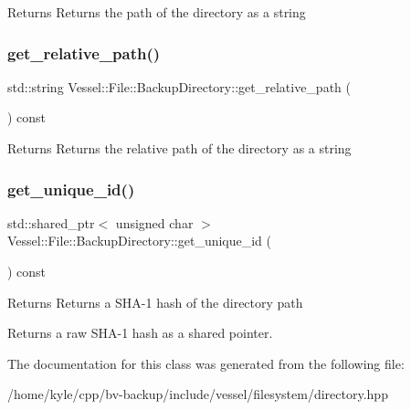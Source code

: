 \begin{DoxyReturn}{Returns}
Returns the path of the directory as a string 
\end{DoxyReturn}
\mbox{\label{class_vessel_1_1_file_1_1_backup_directory_a5c16b60753eeefbf7426fb08c99a73bd}} 
\subsubsection{\texorpdfstring{get\+\_\+relative\+\_\+path()}{get\_relative\_path()}}
{\footnotesize\ttfamily std\+::string Vessel\+::\+File\+::\+Backup\+Directory\+::get\+\_\+relative\+\_\+path (\begin{DoxyParamCaption}{ }\end{DoxyParamCaption}) const}

\begin{DoxyReturn}{Returns}
Returns the relative path of the directory as a string 
\end{DoxyReturn}
\mbox{\label{class_vessel_1_1_file_1_1_backup_directory_af924ae419294ea1ceed5bf9ff13998ce}} 
\subsubsection{\texorpdfstring{get\+\_\+unique\+\_\+id()}{get\_unique\_id()}}
{\footnotesize\ttfamily std\+::shared\+\_\+ptr$<$ unsigned char $>$ Vessel\+::\+File\+::\+Backup\+Directory\+::get\+\_\+unique\+\_\+id (\begin{DoxyParamCaption}{ }\end{DoxyParamCaption}) const}

\begin{DoxyReturn}{Returns}
Returns a S\+H\+A-\/1 hash of the directory path

Returns a raw S\+H\+A-\/1 hash as a shared pointer. 
\end{DoxyReturn}


The documentation for this class was generated from the following file\+:\begin{DoxyCompactItemize}
\item 
/home/kyle/cpp/bv-\/backup/include/vessel/filesystem/directory.\+hpp\end{DoxyCompactItemize}
